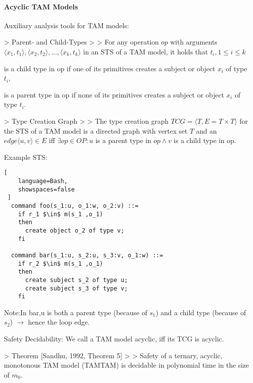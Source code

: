 \documentclass[a4paper]{article}
\begin{document}
\begin{multicols}{3}
    \paragraph{Acyclic TAM Models}
    Auxiliary analysis tools for TAM models:

    > Parent- and Child-Types
    >
    > For any operation $op$ with arguments $⟨x_1,t_1⟩,⟨x_2,t_2⟩,...,⟨x_k,t_k⟩$ in an STS of a TAM model, it holds that $t_i, 1\leq i\leq k$
    \begin{itemize*}
        \item is a child type in op if one of its primitives creates a subject or object $x_i$ of type $t_i$,
        \item is a parent type in op if none of its primitives creates a subject or object $x_i$ of type $t_i$.
    \end{itemize*}

    > Type Creation Graph
    >
    > The type creation graph $TCG=⟨T,E=T\times T⟩$ for the STS of a TAM model is a directed graph with vertex set $T$ and an $edge⟨u,v⟩\in E$ iff $\exists op\in OP:u$ is a parent type in $op\wedge v$ is a child type in op.

    Example STS:
    \begin{lstlisting}[
    language=Bash,
    showspaces=false
 ]
  command foo(s_1:u, o_1:w, o_2:v) ::=
    if r_1 $\in$ m(s_1 ,o_1)
    then
      create object o_2 of type v;
    fi
  
  command bar(s_1:u, s_2:u, s_3:v, o_1:w) ::=
    if r_2 $\in$ m(s_1 ,o_1)
    then
      create subject s_2 of type u;
      create subject s_3 of type v;
    fi
  \end{lstlisting}

    Note:In bar,u is both a parent type (because of $s_1$) and a child type (because of $s_2$) $\rightarrow$  hence the loop edge.

    Safety Decidability: We call a TAM model acyclic, iff its TCG is acyclic.

    > Theorem [Sandhu, 1992, Theorem 5]
    >
    > Safety of a ternary, acyclic, monotonous TAM model (TAMTAM) is decidable in polynomial time in the size of $m_0$.


\end{multicols}
\end{document}

